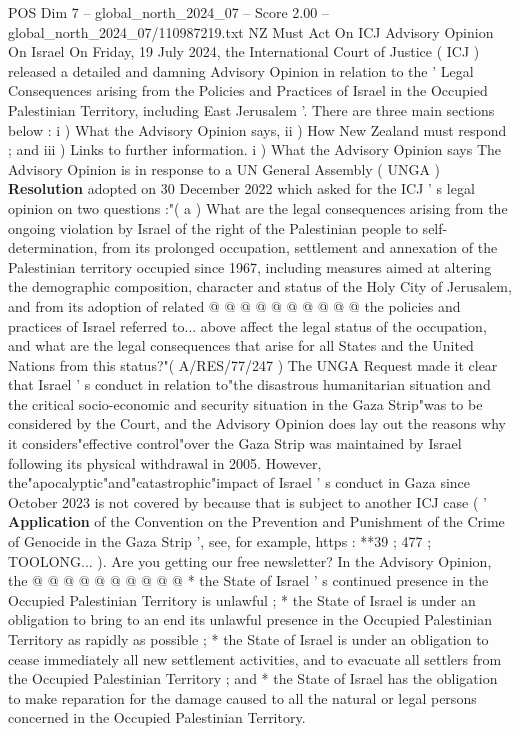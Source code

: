 \begin{textsample}{POS Dim 7 – global\_north\_2024\_07 – Score 2.00 – global\_north\_2024\_07/110987219.txt}  \label{ex:f7_pos_330}
NZ Must Act On ICJ Advisory Opinion On Israel On Friday, 19 July 2024, the International Court of Justice ( ICJ ) released a detailed and damning Advisory Opinion in relation to the ' Legal Consequences arising from the Policies and Practices of Israel in the Occupied Palestinian Territory, including East Jerusalem '.
There are three main sections below : i ) What the Advisory Opinion says, ii ) How New Zealand must respond ; and iii ) Links to further information. i ) What the Advisory Opinion says The Advisory Opinion is in response to a UN General Assembly ( UNGA ) \textbf{Resolution} adopted on 30 December 2022 which asked for the ICJ ' s legal opinion on two questions :"( a ) What are the legal consequences arising from the ongoing violation by Israel of the right of the Palestinian people to self-determination, from its prolonged occupation, settlement and annexation of the Palestinian territory occupied since 1967, including measures aimed at altering the demographic composition, character and status of the Holy City of Jerusalem, and from its adoption of related @ @ @ @ @ @ @ @ @ @ the policies and practices of Israel referred to... above affect the legal status of the occupation, and what are the legal consequences that arise for all States and the United Nations from this status?"( A/RES/77/247 ) The UNGA Request made it clear that Israel ' s conduct in relation to"the disastrous humanitarian situation and the critical socio-economic and security situation in the Gaza Strip"was to be considered by the Court, and the Advisory Opinion does lay out the reasons why it considers"effective control"over the Gaza Strip was maintained by Israel following its physical withdrawal in 2005.
However, the"apocalyptic"and"catastrophic"impact of Israel ' s conduct in Gaza since October 2023 is not covered by because that is subject to another ICJ case ( ' \textbf{Application} of the Convention on the Prevention and Punishment of the Crime of Genocide in the Gaza Strip ', see, for example, https : **39 ; 477 ; TOOLONG... ).
Are you getting our free newsletter?
In the Advisory Opinion, the @ @ @ @ @ @ @ @ @ @ * the State of Israel ' s continued presence in the Occupied Palestinian Territory is unlawful ; * the State of Israel is under an obligation to bring to an end its unlawful presence in the Occupied Palestinian Territory as rapidly as possible ; * the State of Israel is under an obligation to cease immediately all new settlement activities, and to evacuate all settlers from the Occupied Palestinian Territory ; and * the State of Israel has the obligation to make reparation for the damage caused to all the natural or legal persons concerned in the Occupied Palestinian Territory.

\end{textsample}
